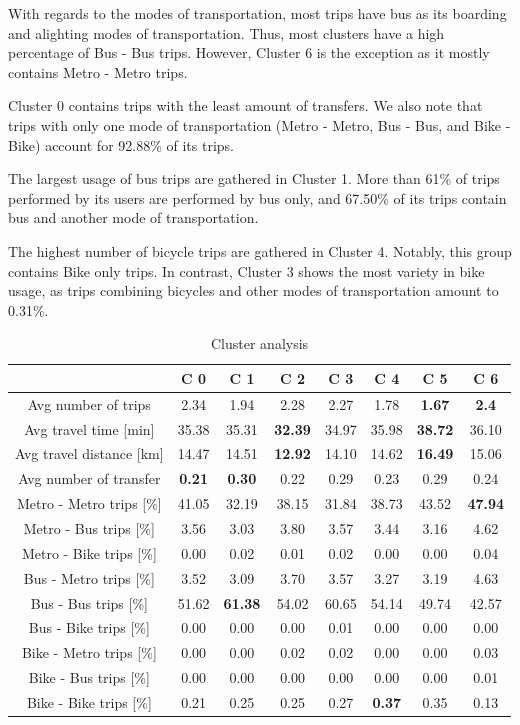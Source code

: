 \documentclass{article}
\begin{document}
With regards to the modes of transportation, most trips have bus as its boarding and alighting modes of transportation. Thus, most clusters have a high percentage of Bus - Bus trips. However, Cluster 6 is the exception as it mostly contains Metro - Metro trips. 

Cluster 0 contains trips with the least amount of transfers. We also note that trips with only one mode of transportation (Metro - Metro, Bus - Bus, and Bike - Bike) account for 92.88\% of its trips.

The largest usage of bus trips are gathered in Cluster 1. More than 61\% of trips performed by its users are performed by bus only, and 67.50\% of its trips contain bus and another mode of transportation.  

The highest number of bicycle trips are gathered in Cluster 4. Notably, this group contains Bike only trips. In contrast, Cluster 3 shows the most variety in bike usage, as trips combining bicycles and other modes of transportation amount to 0.31\%. 

\begin{table}[H]
\centering
\begin{tabular}{||c|c|c|c|c|c|c|c||}
\hline
 & \textbf{C 0} & \textbf{C 1} & \textbf{C 2} & \textbf{C 3} & \textbf{C 4}  & \textbf{C 5} & \textbf{C 6} \\
[0.5ex] 
\hline \hline 
Avg number of trips & 2.34 & 1.94 & 2.28 & 2.27 & 1.78 & \textbf{1.67} & \textbf{2.4} \\
Avg travel time [min] & 35.38 & 35.31 & \textbf{32.39} & 34.97 & 35.98 & \textbf{38.72} & 36.10 \\
Avg travel distance [km] & 14.47 & 14.51 & \textbf{12.92} & 14.10 & 14.62 & \textbf{16.49} & 15.06 \\ 
Avg number of transfer & \textbf{0.21} & \textbf{0.30} & 0.22 & 0.29 & 0.23 & 0.29 & 0.24 \\ 
\hline
Metro - Metro trips [\%] & 41.05 & 32.19 & 38.15 & 31.84 & 38.73 & 43.52 & \textbf{47.94} \\ 
Metro - Bus trips [\%] & 3.56 & 3.03 & 3.80 & 3.57 & 3.44 & 3.16 & 4.62 \\
Metro - Bike trips [\%] & 0.00 & 0.02 & 0.01 & 0.02 & 0.00 & 0.00 & 0.04 \\
Bus - Metro trips [\%] & 3.52 & 3.09 & 3.70 & 3.57 & 3.27 & 3.19 & 4.63 \\ 
Bus - Bus trips [\%] & 51.62 & \textbf{61.38} & 54.02 & 60.65 & 54.14 & 49.74 & 42.57    \\ 
Bus - Bike trips [\%] & 0.00 & 0.00 & 0.00 & 0.01 & 0.00 & 0.00 & 0.00  \\
Bike - Metro trips [\%] & 0.00 & 0.00 & 0.02 & 0.02 & 0.00 & 0.00 & 0.03 \\
Bike - Bus trips [\%] & 0.00 & 0.00 & 0.00 & 0.00 & 0.00 & 0.00 & 0.01  \\
Bike - Bike trips [\%] & 0.21 & 0.25 & 0.25 & 0.27 & \textbf{0.37} & 0.35 & 0.13 \\  [1ex]
\hline 
\end{tabular}
\caption{Cluster analysis} %
\label{table:clusterAnalysis}
\end{table}
\end{document}
